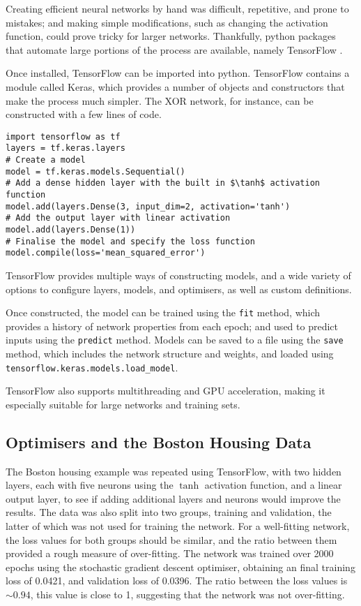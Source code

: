 Creating efficient neural networks by hand was difficult, repetitive, and prone
to mistakes; and making simple modifications, such as changing the activation
function, could prove tricky for larger networks.
Thankfully, python packages that automate large portions of the process are
available, namely TensorFlow \citep{Abadi:2016:Tensorflow}.

Once installed, TensorFlow can be imported into python.
TensorFlow contains a module called Keras, which provides a number of objects
and constructors that make the process much simpler.
The XOR network, for instance, can be constructed with a few lines of code.
\begin{verbatim}
import tensorflow as tf
layers = tf.keras.layers
# Create a model
model = tf.keras.models.Sequential()
# Add a dense hidden layer with the built in $\tanh$ activation function
model.add(layers.Dense(3, input_dim=2, activation='tanh')
# Add the output layer with linear activation
model.add(layers.Dense(1))
# Finalise the model and specify the loss function
model.compile(loss='mean_squared_error')
\end{verbatim}
TensorFlow provides multiple ways of constructing models, and a wide variety of
options to configure layers, models, and optimisers, as well as custom
definitions.

Once constructed, the model can be trained using the \texttt{fit} method, which
provides a history of network properties from each epoch; and used to predict
inputs using the \texttt{predict} method.
Models can be saved to a file using the \texttt{save} method, which includes the
network structure and weights, and loaded using
\texttt{tensorflow.keras.models.load\_model}.

TensorFlow also supports multithreading and GPU acceleration, making it
especially suitable for large networks and training sets.



\subsection{Optimisers and the Boston Housing Data}

The Boston housing example was repeated using TensorFlow, with two hidden
layers, each with five neurons using the $\tanh$ activation function, and a
linear output layer, to see if adding additional layers and neurons would
improve the results.
The data was also split into two groups, training and validation, the latter of
which was not used for training the network.
For a well-fitting network, the loss values for both groups should be similar,
and the ratio between them provided a rough measure of over-fitting.
The network was trained over 2000 epochs using the stochastic gradient descent
optimiser, obtaining an final training loss of 0.0421, and validation loss of
0.0396.
The ratio between the loss values is $\sim0.94$, this value is close to 1,
suggesting that the network was not over-fitting.

